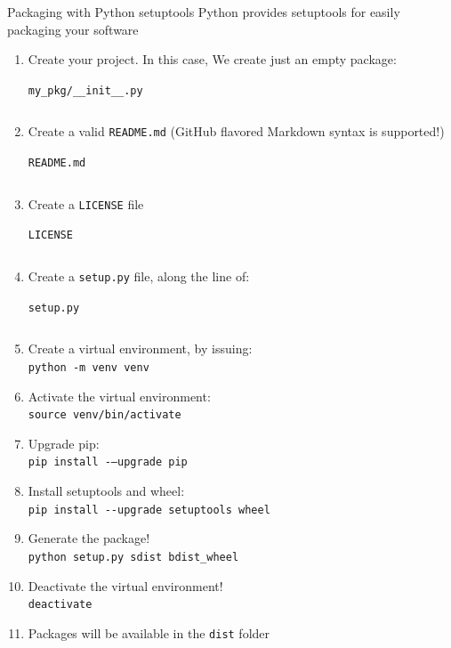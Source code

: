 \documentclass[presentation]{beamer}
\newcommand{\codefile}[4]{
	\begin{block}{\texttt{#2}}
		\inputminted[fontsize=#3,linenos=true,breaklines=true]{#4}{"workspace/#1/#2"}
	\end{block}
}
\newcommand{\python}[3]{\codefile{#1}{#2}{#3}{python}}
\newcommand{\terminal}[3]{\codefile{#1}{#2}{#3}{text}}
\begin{document}
\begin{frame}{Packaging with Python setuptools}
    Python provides setuptools for easily packaging your software
    \begin{enumerate}
        \item Create your project. In this case, We create just an empty package:
        \python{25-setuptools}{my\string_pkg/\string_\string_init\string_\string_.py}{\normalsize}
        \item Create a valid \texttt{README.md} (GitHub flavored Markdown syntax is supported!)
        \terminal{25-setuptools}{README.md}{\scriptsize}
        \item Create a \texttt{LICENSE} file
        \terminal{25-setuptools}{LICENSE}{\scriptsize}
        \item Create a \texttt{setup.py} file, along the line of:
        \python{25-setuptools}{setup.py}{\tiny}
        \item Create a virtual environment, by issuing: \\
        \texttt{python -m venv venv}
        \item Activate the virtual environment: \\
        \texttt{source venv/bin/activate}
        \item Upgrade pip: \\
        \texttt{pip install -{}–upgrade pip}
        \item Install setuptools and wheel: \\
        \texttt{pip install -{}-upgrade setuptools wheel}
        \item Generate the package! \\
        \texttt{python setup.py sdist bdist\string_wheel}
        \item Deactivate the virtual environment! \\
        \texttt{deactivate}
        \item Packages will be available in the \texttt{dist} folder
    \end{enumerate}
\end{frame}

\section*{\refname}
\begin{frame}[allowframebreaks]
  \frametitle{\refname}
  \scriptsize 
  
  
\end{frame}
\section*{\refname}
\end{document}

